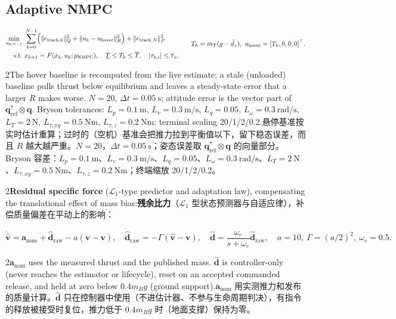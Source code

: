 \documentclass[10pt,a4paper]{article}
\numberwithin{equation}{section}
\newcommand{\mB}{m_B}
\newcommand{\mT}{m_T}
\newcommand{\pair}[2]{\begin{paracol}{2}#1\switchcolumn #2\end{paracol}}
\newcommand{\bsub}[2]{\needspace{8\baselineskip}\subsection{#1\quad{\normalfont #2}}}
\begin{document}
\bsub{Adaptive NMPC}{自适应 NMPC}
\begin{equation}
\begin{aligned}
\min_{u_{0:N-1}}\ &\sum_{k=0}^{N-1}\Bigl(\lVert e_{\mathrm{track},k}\rVert^2_Q+\lVert u_k-u_{\mathrm{hover}}\rVert^2_R\Bigr)+\lVert e_{\mathrm{track},N}\rVert^2_P\\
\text{s.t.}\ & x_{k+1}=F(x_k,u_k;p_{\mathrm{NMPC}}),\quad \underline T\le T_k\le\overline T,\quad |\tau_{k,i}|\le\overline\tau_i,
\end{aligned}
\qquad
T_h=\mT(g-\hat d_z),\ u_{\mathrm{hover}}=[T_h,0,0,0]^\top.
\label{eq:nmpc}
\end{equation}
\pair{The hover baseline is recomputed from the live estimate; a stale
(unloaded) baseline pulls thrust below equilibrium and leaves a steady-state
error that a larger $R$ makes worse. $N=20$, $\Delta t=\SI{0.05}{\second}$;
attitude error is the vector part of $\bm q_{\mathrm{ref}}^*\otimes\bm q$.
Bryson tolerances: $L_p=\SI{0.1}{\meter}$, $L_v=\SI{0.3}{\meter\per\second}$,
$L_q=0.05$, $L_\omega=\SI{0.3}{\radian\per\second}$, $L_T=\SI{2}{\newton}$,
$L_{\tau,xy}=\SI{0.5}{\newton\meter}$, $L_{\tau,z}=\SI{0.2}{\newton\meter}$;
terminal scaling 20/1/2/0.2.}
{悬停基准按实时估计重算；过时的（空机）基准会把推力拉到平衡值以下，留下稳态误差，而且 $R$ 越大越严重。$N=20$，$\Delta t=\SI{0.05}{\second}$；姿态误差取 $\bm q_{\mathrm{ref}}^*\otimes\bm q$ 的向量部分。Bryson 容差：$L_p=\SI{0.1}{\meter}$、$L_v=\SI{0.3}{\meter\per\second}$、$L_q=0.05$、$L_\omega=\SI{0.3}{\radian\per\second}$、$L_T=\SI{2}{\newton}$、$L_{\tau,xy}=\SI{0.5}{\newton\meter}$、$L_{\tau,z}=\SI{0.2}{\newton\meter}$；终端缩放 20/1/2/0.2。}

\pair{\textbf{Residual specific force} ($\mathcal L_1$-type predictor and
adaptation law), compensating the translational effect of mass bias:}
{\textbf{残余比力}（$\mathcal L_1$ 型状态预测器与自适应律），补偿质量偏差在平动上的影响：}
\begin{equation}
\dot{\hat{\bm v}}=\bm a_{\mathrm{nom}}+\hat{\bm d}_{\mathrm{raw}}-a(\hat{\bm v}-\bm v),\quad
\dot{\hat{\bm d}}_{\mathrm{raw}}=-\Gamma(\hat{\bm v}-\bm v),\quad
\hat{\bm d}=\frac{\omega_c}{s+\omega_c}\hat{\bm d}_{\mathrm{raw}},\quad
a=10,\ \Gamma=(a/2)^2,\ \omega_c=0.5 .
\label{eq:l1}
\end{equation}
\pair{$\bm a_{\mathrm{nom}}$ uses the measured thrust and the published mass.
$\hat{\bm d}$ is controller-only (never reaches the estimator or lifecycle),
reset on an accepted commanded release, and held at zero below
$0.4\mB g$ (ground support).}
{$\bm a_{\mathrm{nom}}$ 用实测推力和发布的质量计算。$\hat{\bm d}$ 只在控制器中使用（不进估计器、不参与生命周期判决），有指令的释放被接受时复位，推力低于 $0.4\mB g$ 时（地面支撑）保持为零。}
\end{document}
